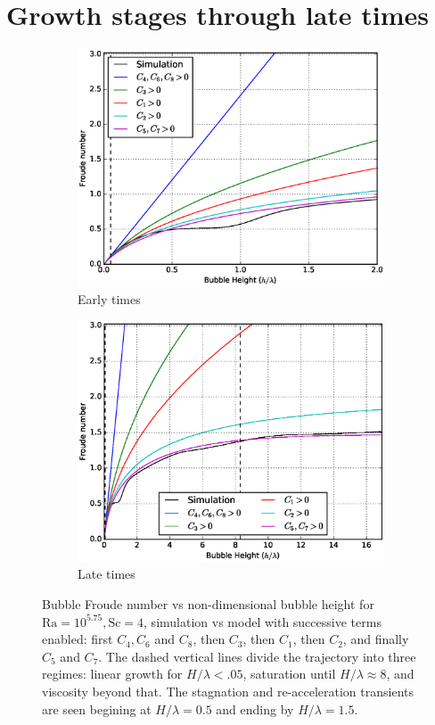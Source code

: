 \section{Growth stages through late times} 

\begin{figure}
\begin{subfigure}[c]{0.5\textwidth}
\includegraphics[width=\textwidth]{figs/Cascade-short-4-1}
\caption{Early times}
\end{subfigure}
\begin{subfigure}[c]{0.5\textwidth}
\includegraphics[width=\textwidth]{figs/Cascade-4-1}
\caption{Late times}
\end{subfigure}
\caption{ 
Bubble Froude number vs non-dimensional bubble height for $\text{Ra} = 10^{5.75}, \text{Sc} = 4$, simulation vs model with successive terms enabled: first $C_4, C_6$ and $C_8$, then $C_3$, then $C_1$, then $C_2$, and finally $C_5$ and $C_7$.
The dashed vertical lines divide the trajectory into three regimes: linear growth for $H/\lambda < .05$, saturation until $H / \lambda \approx 8$, and viscosity beyond that.
The stagnation and re-acceleration transients are seen begining at $H/\lambda = 0.5$ and ending by $H / \lambda = 1.5$.
}
\end{figure}

